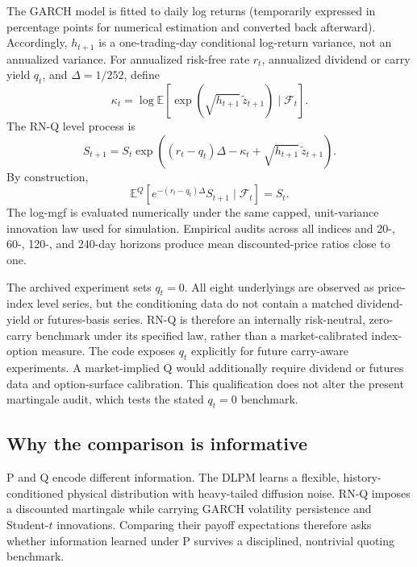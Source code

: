 ﻿\documentclass[12pt,letterpaper]{article}
\begin{document}
The GARCH model is fitted to daily log returns (temporarily expressed in
percentage points for numerical estimation and converted back afterward).
Accordingly, $h_{t+1}$ is a one-trading-day conditional log-return variance,
not an annualized variance. For annualized risk-free rate $r_t$, annualized
dividend or carry yield $q_t$, and $\Delta=1/252$, define
\begin{equation}
\kappa_t=\log\mathbb E\left[
\exp\left(\sqrt{h_{t+1}}\,\widetilde z_{t+1}\right)
\mid\mathcal F_t\right].
\end{equation}
The RN-Q level process is
\begin{equation}
S_{t+1}=S_t\exp\left((r_t-q_t)\Delta-\kappa_t+
\sqrt{h_{t+1}}\,\widetilde z_{t+1}\right).
\label{eq:rnq}
\end{equation}
By construction,
\begin{equation}
\mathbb E^Q[e^{-(r_t-q_t)\Delta}S_{t+1}\mid\mathcal F_t]=S_t.
\end{equation}
The log-mgf is evaluated numerically under the same capped,
unit-variance innovation law used for simulation. Empirical audits across all
indices and 20-, 60-, 120-, and 240-day horizons produce mean discounted-price
ratios close to one.

The archived experiment sets $q_t=0$. All eight underlyings are observed as
price-index level series, but the conditioning data do not contain a matched
dividend-yield or futures-basis series. RN-Q is therefore an internally
risk-neutral, zero-carry benchmark under its specified law, rather than a
market-calibrated index-option measure. The code exposes $q_t$ explicitly for
future carry-aware experiments. A market-implied Q would additionally require
dividend or futures data and option-surface calibration. This qualification
does not alter the present martingale audit, which tests the stated $q_t=0$
benchmark.

\subsection{Why the comparison is informative}

P and Q encode different information. The DLPM learns a flexible,
history-conditioned physical distribution with heavy-tailed diffusion noise.
RN-Q imposes a discounted martingale while carrying GARCH volatility
persistence and Student-$t$ innovations. Comparing their payoff expectations
therefore asks whether information learned under P survives a disciplined,
nontrivial quoting benchmark.
\end{document}
